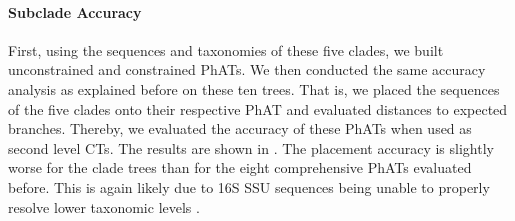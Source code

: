 
\paragraph{Subclade Accuracy}
\label{ch:AutomaticTrees:sec:Evaluation:sub:MultilevelPlacement:par:SubcladeAccuracy}

First, using the sequences and taxonomies of these five clades, we built unconstrained and constrained \acp{PhAT}.
We then conducted the same accuracy analysis as explained before on these ten trees.
That is, we placed the  sequences of the five clades onto their respective \ac{PhAT}
and evaluated distances to expected branches.
Thereby, we evaluated the accuracy of these \acp{PhAT} when used as second level \aclp{CT}.
The results are shown in .
The placement accuracy is slightly worse for the clade trees than for the eight comprehensive \acp{PhAT} evaluated before.
This is again likely due to 16S SSU sequences being unable to properly resolve lower taxonomic levels \citep{Janda2007}.

